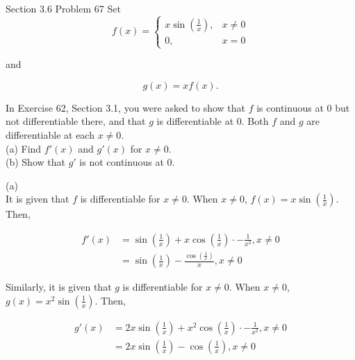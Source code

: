 \documentclass{article}
\begin{document}
    \begin{tbhtheorem}{Section 3.6 Problem 67}
        Set
        \[
            f(x) =
            \begin{cases}
                x\sin{\left(\frac{1}{x}\right)},    & x\not = 0 \\
                0,                                  & x = 0
            \end{cases}
        \]

        and

        \[
            g(x) = xf(x).
        \]

        In Exercise 62, Section 3.1, you were asked to show that $f$ is continuous at 0 but not differentiable there, and that $g$ is differentiable at 0. Both $f$ and $g$ are differentiable at each $x\not = 0$. \\
        (a) Find $f'(x)$ and $g'(x)$ for $x\not = 0$. \\
        (b) Show that $g'$ is not continuous at 0.
    \end{tbhtheorem}

    (a) \\
    It is given that $f$ is differentiable for $x\not = 0$. When $x\not = 0$, $f(x) = x\sin{\left(\frac{1}{x}\right)}$. Then,

    \begin{align*}
        f'(x)       &= \sin{\left(\frac{1}{x}\right)} + x\cos{\left(\frac{1}{x}\right)} \cdot -\frac{1}{x^2}, x\not = 0 \\
                    &= \sin{\left(\frac{1}{x}\right)} - \frac{\cos{\left(\frac{1}{x}\right)}}{x}, x\not = 0
    \end{align*}

    Similarly, it is given that $g$ is differentiable for $x\not = 0$. When $x\not = 0$, $g(x) = x^2 \sin{\left(\frac{1}{x}\right)}$. Then,

    \begin{align*}
        g'(x)       &= 2x\sin{\left(\frac{1}{x}\right)} + x^2 \cos{\left(\frac{1}{x}\right)} \cdot -\frac{1}{x^2}, x\not = 0 \\
                    &= 2x\sin{\left(\frac{1}{x}\right)} - \cos{\left(\frac{1}{x}\right)}, x\not = 0
    \end{align*}

    \pagebreak
    \thispagestyle{page9}
\end{document}
